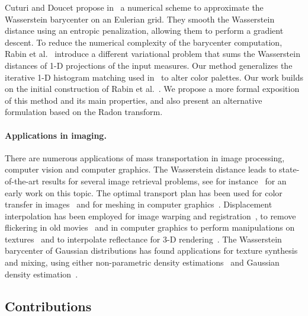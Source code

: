 Cuturi and Doucet propose in~\cite{CuturiBarycenter} a numerical scheme to approximate the Wasserstein barycenter on an Eulerian grid. They smooth the Wasserstein distance using an entropic penalization, allowing them to perform a gradient descent. To reduce the numerical complexity of the barycenter computation, Rabin et al.~\cite{Rabin_ssvm11} introduce a different variational problem that sums the Wasserstein distances of 1-D projections of the input measures. Our method generalizes the iterative 1-D histogram matching used in~ to alter color palettes. Our work builds on the initial construction of  Rabin et al.~\cite{Rabin_ssvm11}. We propose a more formal exposition of this method and its main properties, and also present an alternative formulation based on the Radon transform. 



\paragraph{Applications in imaging. }

There are numerous applications of mass transportation in image processing, computer vision and computer graphics. The Wasserstein distance leads to state-of-the-art results for several image retrieval problems, see for instance~\cite{Rubner1998} for an early work on this topic. The optimal transport plan has been used for color transfer in images~\cite{pitie2005n} and for meshing in computer graphics~\cite{digne-reconstruction}.  Displacement interpolation has been employed for image warping and registration~\cite{haker2004,Merigot2011}, to remove flickering in old movies~\cite{Delon-midway} and in computer graphics to perform manipulations on textures~\cite{matusik2005texture} and to interpolate reflectance for 3-D rendering~\cite{Bonneel-displacement}. The Wasserstein barycenter of Gaussian distributions has found applications for texture synthesis and mixing, using either non-parametric density estimations~\cite{Rabin_ssvm11} and Gaussian density estimation~\cite{peyre2013Gaussians}.


\subsection{Contributions}

